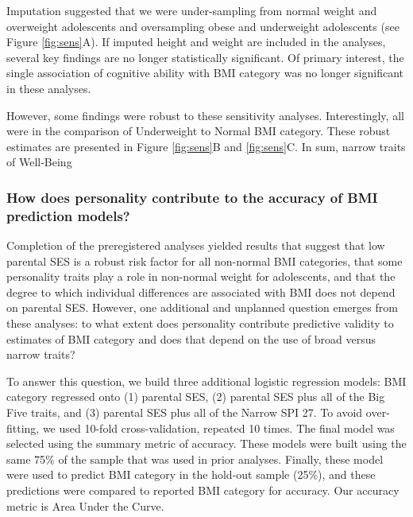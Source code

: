 \documentclass[man]{apa6}
\begin{document}
Imputation suggested that we were under-sampling from normal weight and overweight adolescents and oversampling obese and underweight adolescents (see Figure \ref{fig:sens}A). If imputed height and weight are included in the analyses, several key findings are no longer statistically significant. Of primary interest, the single association of cognitive ability with BMI category was no longer significant in these analyses.

However, some findings were robust to these sensitivity analyses. Interestingly, all were in the comparison of Underweight to Normal BMI category. These robust estimates are presented in Figure \ref{fig:sens}B and \ref{fig:sens}C. In sum, narrow traits of Well-Being

\hypertarget{how-does-personality-contribute-to-the-accuracy-of-bmi-prediction-models}{%
\subsubsection{How does personality contribute to the accuracy of BMI prediction models?}\label{how-does-personality-contribute-to-the-accuracy-of-bmi-prediction-models}}

Completion of the preregistered analyses yielded results that suggest that low parental SES is a robust risk factor for all non-normal BMI categories, that some personality traits play a role in non-normal weight for adolescents, and that the degree to which individual differences are associated with BMI does not depend on parental SES. However, one additional and unplanned question emerges from these analyses: to what extent does personality contribute predictive validity to estimates of BMI category and does that depend on the use of broad versus narrow traits?

To answer this question, we build three additional logistic regression models: BMI category regressed onto (1) parental SES, (2) parental SES plus all of the Big Five traits, and (3) parental SES plus all of the Narrow SPI 27. To avoid over-fitting, we used 10-fold cross-validation, repeated 10 times. The final model was selected using the summary metric of accuracy. These models were built using the same 75\% of the sample that was used in prior analyses. Finally, these model were used to predict BMI category in the hold-out sample (25\%), and these predictions were compared to reported BMI category for accuracy. Our accuracy metric is Area Under the Curve.
\end{document}
